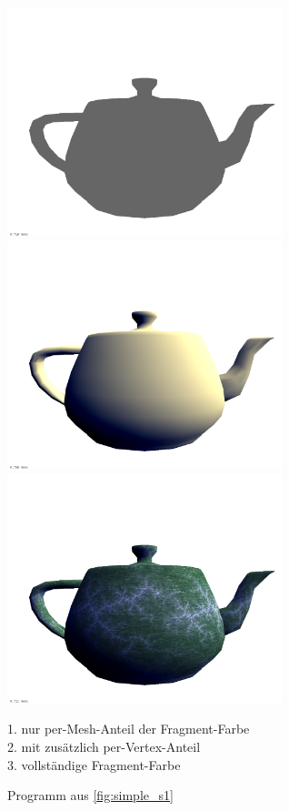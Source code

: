 \documentclass[twoside,a4paper,fleqn,12pt]{book}
\begin{document}
\begin{figure}[h]
  \centering
  \includegraphics[width=8cm]{simple_s1_mesh}\\
  \includegraphics[width=8cm]{simple_s1_vert}\\
  \includegraphics[width=8cm]{simple_s1_frag}
  \caption{Programm aus \ref{fig:simple_s1}}
  \small 1. nur per-Mesh-Anteil der Fragment-Farbe\\
  2. mit zusätzlich per-Vertex-Anteil\\
  3. vollständige Fragment-Farbe\\
  \label{fig:simple_s1_images}
\end{figure}
\end{document}

